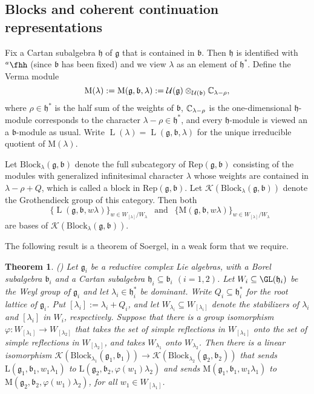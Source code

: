 \documentclass[12pt,a4paper]{amsart}
\def\subset{\subseteq}
\newcommand{\CK}{{\mathcal {K}}}
\newcommand{\CU}{{\mathcal {U}}}
\newcommand{\oL}{\operatorname{L}}
\newcommand{\g}{\mathfrak g}
\newcommand{\h}{\mathfrak h}
\renewcommand{\b}{\mathfrak b}
\numberwithin{equation}{section}
\newtheorem{thm}{Theorem}[section]
\theoremstyle{remark}
\def\hha{{}^a\fhh}
\begin{document}
\subsection{Blocks and coherent continuation representations}%

Fix a Cartan subalgebra $\h$ of $\g$ that is contained in $\b$. Then $\h$ is identified with $\hha$ (since $\b$ has been fixed) and we view $\lambda$ as an element of $\h^*$.
Define the Verma module
\[
  \mathrm M(\lambda):=\mathrm M(\g,\b,\lambda):=\CU(\g)\otimes_{\CU(\b)} \C_{\lambda-\rho},
\]
where $\rho\in \h^*$ is the half sum of the weights of $\b$, $\mathbb{C}_{\lambda-\rho}$ is the one-dimensional $\h$-module corresponds to the character $\lambda-\rho\in \h^*$, and every $\h$-module is viewed an a $\b$-module as usual.
Write
$\oL(\lambda)=\oL(\g,\b,\lambda)$ for the unique irreducible quotient of $ \mathrm M(\lambda)$.

Let $\mathrm{Block}_{\lambda}(\g, \b)$ denote the full subcategory of $\mathrm{Rep}(\g, \b)$ consisting of the modules with generalized infinitesimal character  $\lambda$ whose weights are contained in $\lambda-\rho+Q$, which is called a block in  $\mathrm{Rep}(\g, \b)$. Let $\CK(\mathrm{Block}_{\lambda}(\g, \b))$ denote the Grothendieck group of this category. Then both \[
\textrm{ $\{\oL(\g,\b, w \lambda)\}_{w\in W_{[\lambda]}/W_\lambda}\ \ $ and $\ \  \{\mathrm M(\g,\b, w \lambda)\}_{w\in W_{[\lambda]}/W_\lambda}$}
\]
 are bases of   $\CK(\mathrm{Block}_{\lambda}(\g, \b))$.

The following result is a theorem of Soergel, in a weak form that we require.

\begin{thm}\label{soer}(\cite[Section 2.5, Theorem 11]{Soergel})
Let $\g_i$ be a  reductive complex  Lie algebras, with a Borel subalgebra $\b_i$ and a Cartan subalgebra $\h_i\subset \b_i$ $(i=1,2)$. Let $W_i\subset \GL(\h_i)$ be the Weyl group of $\g_i$ and let $\lambda_i\in \h_i^*$ be dominant.  Write $Q_i\subset \h_i^*$ for the root lattice of $\g_i$. Put $[\lambda_i]:=\lambda_i+Q_i$, and let
$
 W_{\lambda_i}\subset W_{[\lambda_i]}
$
denote the stabilizers of $\lambda_i$ and $ [\lambda_i]$ in $W_i$, respectively. Suppose that  there is a  group
isomorphism $\varphi: W_{[\lambda_1]}\rightarrow W_{[\lambda_2]}$ that  takes the set of simple reflections in $W_{[\lambda_1]}$ onto the set of simple reflections in $W_{[\lambda_2]}$, and takes $W_{\lambda_1}$  onto  $ W_{\lambda_2}$. Then there is a linear isomorphism   $\CK(\mathrm{Block}_{\lambda_1}(\g_1, \b_1))\rightarrow \CK(\mathrm{Block}_{\lambda_2}(\g_2, \b_2))$ that sends $\mathrm L(\g_1,\b_1,w_1\lambda_1)$ to $\mathrm L(\g_2,\b_2,\varphi(w_1)\lambda_2)$ and sends $\mathrm M(\g_1,\b_1,w_1\lambda_1)$ to $\mathrm M(\g_2,\b_2,\varphi(w_1)\lambda_2)$, for all $w_1\in W_{[\lambda_1]}$.

\end{thm}
\end{document}
